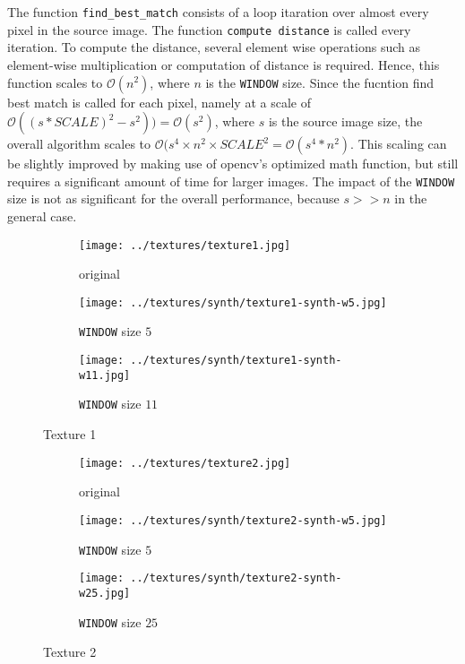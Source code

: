 \documentclass{article}
\begin{document}
The function \texttt{find\_best\_match} consists of a loop itaration over almost every pixel in the source image. The function \texttt{compute distance} is called every iteration. To compute the distance, several element wise operations such as element-wise multiplication or computation of distance is required. Hence, this function scales to $\mathcal{O}(n^2)$, where $n$ is the \texttt{WINDOW} size. 
Since the fucntion find best match is called for each pixel, namely at a scale of $\mathcal{O}((s*SCALE)^2-s^2))=\mathcal{O}(s^2)$, where $s$ is the source image size, the overall algorithm scales to $\mathcal{O}(s^4\times n^2 \times SCALE^2=\mathcal{O}(s^4*n^2)$. This scaling can be slightly improved by  making use of opencv's optimized math function, but still requires a significant amount of time for larger images. 
The impact of the \texttt{WINDOW} size is not as significant for the overall performance, because $s>>n$ in the general case.
\begin{figure}[H]
	\begin{subfigure}{0.33\textwidth}
		\centering
		\texttt{[image: ../textures/texture1.jpg]}
		\caption{original}
		\label{text-1-orig}
	\end{subfigure}%
	\begin{subfigure}{0.33\textwidth}
		\centering
		\texttt{[image: ../textures/synth/texture1-synth-w5.jpg]}
		\caption{\texttt{WINDOW} size $5$}
		\label{text-1-w5}
	\end{subfigure}%
	\begin{subfigure}{0.33\textwidth}
		\centering
		\texttt{[image: ../textures/synth/texture1-synth-w11.jpg]}
		\caption{\texttt{WINDOW} size $11$}
		\label{text-1-w11}
	\end{subfigure}%
	\caption{Texture 1}
	\label{text-1}
\end{figure}



\begin{figure}[H]
	\begin{subfigure}{0.33\textwidth}
		\centering
		\texttt{[image: ../textures/texture2.jpg]}
		\caption{original}
		\label{text-2-orig}
	\end{subfigure}%
	\begin{subfigure}{0.33\textwidth}
		\centering
		\texttt{[image: ../textures/synth/texture2-synth-w5.jpg]}
		\caption{\texttt{WINDOW} size $5$}
		\label{text-2-w5}
	\end{subfigure}%
	\begin{subfigure}{0.33\textwidth}
		\centering
		\texttt{[image: ../textures/synth/texture2-synth-w25.jpg]}
		\caption{\texttt{WINDOW} size $25$}
		\label{text-2-w25}
	\end{subfigure}%
	\caption{Texture 2}
	\label{text-2}
\end{figure}
\end{document}
